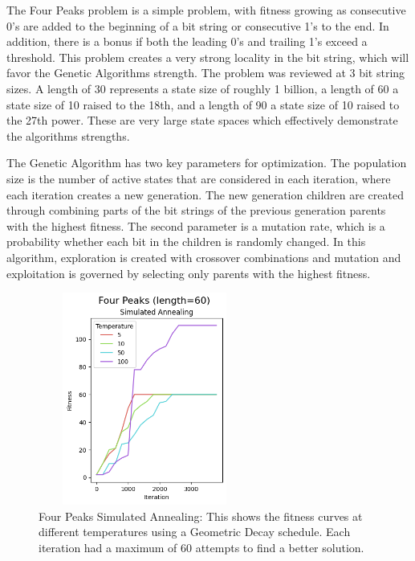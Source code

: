 \documentclass[letterpaper]{article} %
\begin{document}
The Four Peaks problem is a simple problem, with fitness growing as consecutive 0's are added to the beginning of a bit string or consecutive 1's to the end.  In addition, there is a bonus if both the leading 0's and trailing 1's exceed a threshold.  This problem creates a very strong locality in the bit string, which will favor the Genetic Algorithms strength.  The problem was reviewed at 3 bit string sizes.   A length of 30 represents a state size of roughly 1 billion, a length of 60 a state size of 10 raised to the 18th, and a length of 90 a state size of 10 raised to the 27th power.  These are very large state spaces which effectively demonstrate the algorithms strengths. 

The Genetic Algorithm has two key parameters for optimization.  The population size is the number of active states that are considered in each iteration, where each iteration creates a new generation.  The new generation children are  created through combining parts of the bit strings of the previous generation parents with the highest fitness.  The second parameter is a mutation rate, which is a probability whether each bit in the children is randomly changed.  In this algorithm, exploration is created with crossover combinations and mutation and exploitation is governed by selecting only parents with the highest fitness.

\begin{figure}[!htb]
\centering
\includegraphics[width=2.75in, height=2.75in]{figures/Four_Peaks_length=60_Simulated_Annealing_l_60_ma_360_d_geom_t_5__10__50__100_.png}
\caption{Four Peaks Simulated Annealing:  This shows the fitness curves at different temperatures using a Geometric Decay schedule. Each iteration had a maximum of 60 attempts to find a better solution. }
\label{fig:four_peaks_sa}
\end{figure}
\end{document}
